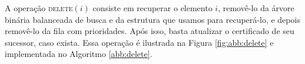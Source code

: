 



A operação \textsc{delete}$(i)$ consiste em recuperar o elemento
$i$, removê-lo da árvore binária balanceada de busca e da estrutura
que usamos para recuperá-lo, e depois removê-lo da fila com
prioridades. Após isso, basta atualizar o certificado de seu
sucessor, caso exista. Essa operação é ilustrada na Figura
\ref{fig:abb:delete} e implementada no Algoritmo \ref{abb:delete}.


